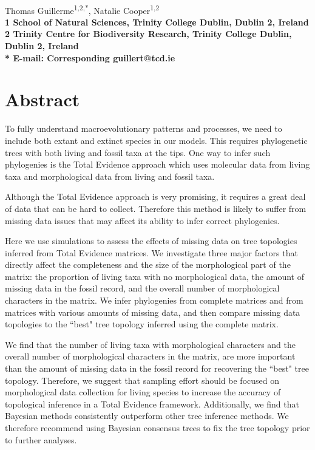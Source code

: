 \documentclass[10pt,letterpaper]{article}
\date{}
\begin{document}
\vspace*{0.35in}

\begin{flushleft}
{\Large
\textbf{}
}
\newline
\\
Thomas Guillerme\textsuperscript{1,2,*},
Natalie Cooper\textsuperscript{1,2}
\\
\bf{1} School of Natural Sciences, Trinity College Dublin, Dublin 2, Ireland
\\
\bf{2} Trinity Centre for Biodiversity Research, Trinity College Dublin, Dublin 2, Ireland
\\
* E-mail: Corresponding guillert@tcd.ie
\end{flushleft}
\section*{Abstract}
To fully understand macroevolutionary patterns and processes, we need to include both extant and extinct species in our models. This requires phylogenetic trees with both living and fossil taxa at the tips. One way to infer such phylogenies is the Total Evidence approach which uses molecular data from living taxa and morphological data from living and fossil taxa.

Although the Total Evidence approach is very promising, it requires a great deal of data that can be hard to collect. Therefore this method is likely to suffer from missing data issues that may affect its ability to infer correct phylogenies.

Here we use simulations to assess the effects of missing data on tree topologies inferred from Total Evidence matrices. We investigate three major factors that directly affect the completeness and the size of the morphological part of the matrix: the proportion of living taxa with no morphological data, the amount of missing data in the fossil record, and the overall number of morphological characters in the matrix. We infer phylogenies from complete matrices and from matrices with various amounts of missing data, and then compare missing data topologies to the ``best" tree topology inferred using the complete matrix.

We find that the number of living taxa with morphological characters and the overall number of morphological characters in the matrix, are more important than the amount of missing data in the fossil record for recovering the ``best" tree topology. Therefore, we suggest that sampling effort should be focused on morphological data collection for living species to increase the accuracy of topological inference in a Total Evidence framework. Additionally, we find that Bayesian methods consistently outperform other tree inference methods. We therefore recommend using Bayesian consensus trees to fix the tree topology prior to further analyses.
\end{document}
